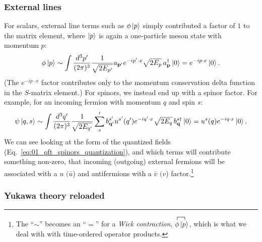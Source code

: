 \subsubsection{External lines}

For scalars, external line terms such as $\phi \ket{p}$ simply contributed a factor of $1$ to the matrix element, where $\ket{p}$ is again a one-particle meson state with momentum $p$:
\begin{equation}
	\label{eq:01_qft_spinors_yukawa_scalar_external}
	\phi \ket{p} \sim \int \frac{d^3p'}{(2\pi)^3} \frac{1}{\sqrt{2E_{p'}}} a_{\mathbf{p}'} e^{-ip'\cdot x} \sqrt{2E_{p}}\, a_{\mathbf{p}}^\dagger \ket{0} = e^{-ip\cdot x} \ket{0}.
\end{equation}
(The $e^{-ip\cdot x}$ factor contributes only to the momentum conservation delta function in the $S$-matrix element.)
For spinors, we instead end up with a spinor factor.
For example, for an incoming fermion with momentum $q$ and spin $s$:
\begin{equation}
	\label{eq:01_qft_spinors_yukawa_spinor_external}
	\psi \ket{q, s} \sim \int \frac{d^3q'}{(2\pi)^3} \frac{1}{\sqrt{2E_{q'}}} \sum_s' b^{s'}_{\mathbf{q}'} u^{s'}(q') e^{-iq'\cdot x} \sqrt{2E_{q}}\, b^{s\dagger}_{\mathbf{q}} \ket{0} = u^s(q) e^{-iq\cdot x} \ket{0}.
\end{equation}
We can see looking at the form of the quantized fields (Eq.~\ref{eq:01_qft_spinors_quantization}), and which terms will contribute something non-zero, that incoming (outgoing) external fermions will be associated with a $u$ $(\bar u$) and antifermions with a $\bar v$ $(v$) factor.\footnote{The ``$\sim$'' becomes an ``$=$'' for a \textit{Wick contraction}, $\contraction{}{\phi}{}{\ket{p}} \phi \ket{p}$, which is what we deal with with time-ordered operator products.}

\subsubsection{Yukawa theory reloaded}


